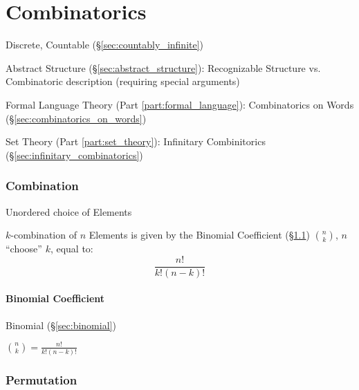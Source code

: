 \part{Combinatorics}\label{part:combinatorics}

Discrete, Countable (\S\ref{sec:countably_infinite})

Abstract Structure (\S\ref{sec:abstract_structure}): Recognizable
Structure vs. Combinatoric description (requiring special arguments)

Formal Language Theory (Part \ref{part:formal_language}):
Combinatorics on Words (\S\ref{sec:combinatorics_on_words})

Set Theory (Part \ref{part:set_theory}): Infinitary Combinitorics
(\S\ref{sec:infinitary_combinatorics})



\section{Combination}\label{sec:combination}

Unordered choice of Elements

$k$-combination of $n$ Elements is given by the Binomial Coefficient
(\S\ref{sec:binomial_coefficient}) $\binom{n}{k}$, $n$ ``choose'' $k$,
equal to:
\[
  \frac{n!}{k!(n - k)!}
\]



\subsection{Binomial Coefficient}\label{sec:binomial_coefficient}

Binomial (\S\ref{sec:binomial})

$\binom{n}{k} = \frac{n!}{k!(n - k)!}$



\section{Permutation}\label{sec:permutation}

